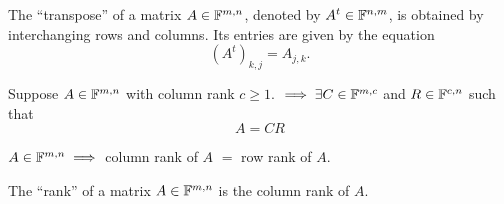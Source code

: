\setcounter{thm}{53}
\begin{mydef}
  The ``transpose'' of a matrix $A\in \mathbb{F}^{m,n}$, denoted by $A^t\in \mathbb{F}^{n,m}$, is obtained by interchanging rows and columns. Its entries are given by the equation
  \begin{equation}
    \left( A^{t} \right)_{k,j} = A_{j,k}.
  \end{equation}
\end{mydef}

\setcounter{thm}{55}
\begin{thm}
  Suppose $A \in \mathbb{F}^{m,n}$ with column rank $c \geq 1.$ $\implies \exists C\in \mathbb{F}^{m,c}$ and $R\in \mathbb{F}^{c,n}$ such that
  \begin{equation}
    A = CR
  \end{equation}
\end{thm}

\begin{thm}
  $A\in \mathbb{F}^{m,n} \implies$ column rank of $A$ $=$ row rank of $A$.
\end{thm}

\begin{mydef} [rank]
  The ``rank'' of a matrix $A \in  \mathbb{F}^{m,n}$ is the column rank of $A$.
\end{mydef}